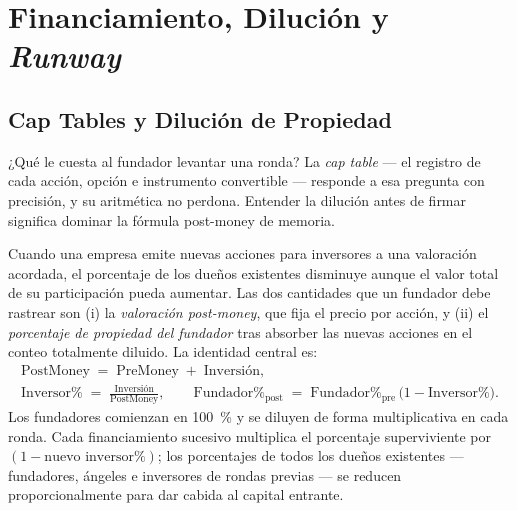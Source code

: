 \chapter{Financiamiento, Dilución y \emph{Runway}}\label{ch:fundraising-and-dilution}


\section{Cap Tables y Dilución de Propiedad}\label{sec:cap-table}

¿Qué le cuesta al fundador levantar una ronda? La \emph{cap table} --- el registro de
cada acción, opción e instrumento convertible --- responde a esa pregunta con precisión, y
su aritmética no perdona. Entender la dilución antes de firmar significa dominar la fórmula
post-money de memoria.

Cuando una empresa emite nuevas acciones para inversores a una valoración acordada, el
porcentaje de los dueños existentes disminuye aunque el valor total de su participación
pueda aumentar. Las dos cantidades que un fundador debe rastrear son (i) la \emph{valoración
post-money}, que fija el precio por acción, y (ii) el \emph{porcentaje de propiedad del
fundador} tras absorber las nuevas acciones en el conteo totalmente diluido. La identidad
central es:
\begin{equation}\label{eq:post-money}
\begin{gathered}
  \mathrm{PostMoney} \;=\; \mathrm{PreMoney} \;+\; \mathrm{Inversión}, \\
  \text{Inversor\%} \;=\; \frac{\mathrm{Inversión}}{\mathrm{PostMoney}}, \qquad
  \text{Fundador\%}_{\mathrm{post}} \;=\; \text{Fundador\%}_{\mathrm{pre}}\,\bigl(1 - \text{Inversor\%}\bigr).
\end{gathered}
\end{equation}
Los fundadores comienzan en \qty{100}{\percent} y se diluyen de forma multiplicativa en
cada ronda. Cada financiamiento sucesivo multiplica el porcentaje superviviente por
\((1 - \text{nuevo inversor\%})\); los porcentajes de todos los dueños existentes ---
fundadores, ángeles e inversores de rondas previas --- se reducen proporcionalmente para
dar cabida al capital entrante.

